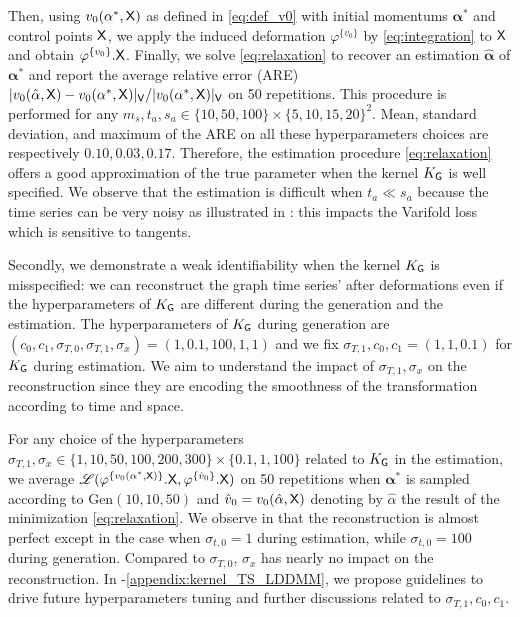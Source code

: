 Then, using $v_0(\mathbf{\alpha}^*,\mathsf{X})$ as defined in \eqref{eq:def_v0} with initial momentums $\mathbf{\alpha}^*$ and control points $\mathsf{X}$, we apply the induced deformation $\varphi^{\{v_0\}} $ by \eqref{eq:integration} to $\mathsf{X}$ and obtain $\varphi^{\{v_0\}}.\mathsf{X}$.
Finally, we solve \eqref{eq:relaxation} to recover an estimation $\hat{\mathbf{\alpha}}$ of $\mathbf{\alpha}^*$ and report the average relative error (ARE) $|v_0(\hat{\mathbf{\alpha}},\mathsf{X})-v_0(\mathbf{\alpha}^*,\mathsf{X})|_{\mathsf{V}}/|v_0(\mathbf{\alpha}^*,\mathsf{X})|_{\mathsf{V}}$ on 50 repetitions.
This procedure is performed for any $m_{s},t_{a},s_{a}\in \{10,50,100\}\times \{5,10,15,20\}^2 $.
Mean, standard deviation, and maximum of the ARE on all these hyperparameters choices are respectively $\mathbf{0.10, 0.03, 0.17}$.
Therefore, the estimation procedure \eqref{eq:relaxation} offers a good approximation of the true parameter when the kernel $K_{\mathsf{G}}$ is well specified.
We observe that the estimation is difficult when $t_a\ll s_a$ because the time series can be very noisy as illustrated in : this impacts the Varifold loss which is sensitive to tangents.

Secondly, we demonstrate a weak identifiability when the kernel $K_{\mathsf{G}}$ is misspecified: we can reconstruct the graph time series' after deformations even if the hyperparameters of $K_{\mathsf{G}}$
are different during the generation and the estimation.
 The hyperparameters of $K_{\mathsf{G}}$ during generation are $(c_0,c_1,\sigma_{T,0},\sigma_{T,1},\sigma_x)=(1,0.1,100,1,1)$ and we fix $\sigma_{T,1},c_0,c_1=(1,1,0.1) $ for $K_{\mathsf{G}}$ during estimation.
 We aim to understand the impact of $\sigma_{T,1},\sigma_x$ on the reconstruction since they are encoding the smoothness of the transformation according to time and space.  

  For any choice of the hyperparameters $\sigma_{T,1},\sigma_x\in \{1,10,50,100,200,300 \}\times \{0.1,1,100\}$ related to $K_{\mathsf{G}}$ in the estimation,
   we average $\mathscr{L}(\varphi^{\{v_0(\mathbf{\alpha}^*,\mathsf{X})\}}.\mathsf{X},\varphi^{\{\hat{v}_0\}}.\mathsf{X})$ on 50 repetitions when $\mathbf{\alpha}^*$ is sampled according to Gen$(10,10,50)$ and $\hat{v}_0=v_0(\hat{\alpha},\mathsf{X})$ denoting by $\hat{\alpha}$ the result of the minimization \eqref{eq:relaxation}.
We observe in  that the reconstruction is almost perfect except in the case when $\sigma_{t,0}=1$ during estimation, while $ \sigma_{t,0}=100$ during generation.
 Compared to $\sigma_{T,0}$, $\sigma_x$ has nearly no impact on the reconstruction.
 In -\ref{appendix:kernel_TS_LDDMM}, we propose guidelines to drive future hyperparameters tuning and further discussions related to $\sigma_{T,1},c_0,c_1$. 

